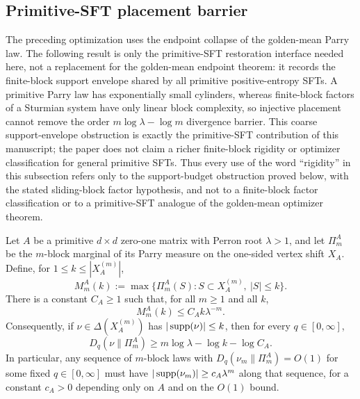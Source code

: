 \subsection{Primitive-SFT placement barrier}

The preceding optimization uses the endpoint collapse of the golden-mean
Parry law.  The following result is only the primitive-SFT restoration
interface needed here, not a replacement for the golden-mean endpoint theorem:
it records the finite-block support envelope shared by all primitive
positive-entropy SFTs.  A primitive Parry law has exponentially small
cylinders, whereas finite-block factors of a Sturmian system have only linear
block complexity, so injective placement cannot remove the order
\(m\log\lambda-\log m\) divergence barrier.  This coarse support-envelope
obstruction is exactly the primitive-SFT contribution of this manuscript; the
paper does not claim a richer finite-block rigidity or optimizer
classification for general primitive SFTs.  Thus every use of the word
``rigidity'' in this subsection refers only to the support-budget obstruction
proved below, with the stated sliding-block factor hypothesis, and not to a
finite-block factor classification or to a primitive-SFT analogue of the
golden-mean optimizer theorem.

\begin{proposition}
\label{prop:primitive-sft-support-envelope}
Let \(A\) be a primitive \(d\times d\) zero-one matrix with Perron root
\(\lambda>1\), and let \(\Pi_m^A\) be the \(m\)-block marginal of its Parry
measure on the one-sided vertex shift \(X_A\).  Define, for
\(1\le k\le |X_A^{(m)}|\),
\[
M_m^A(k):=\max\{\Pi_m^A(S): S\subset X_A^{(m)},\ |S|\le k\}.
\]
There is a constant \(C_A\ge1\) such that, for all \(m\ge1\) and all \(k\),
\[
M_m^A(k)\le C_A k\lambda^{-m}.
\]
Consequently, if \(\nu\in\Delta(X_A^{(m)})\) has \(|\operatorname{supp}(\nu)|\le k\), then
for every \(q\in[0,\infty]\),
\[
D_q(\nu\|\Pi_m^A)\ge m\log\lambda-\log k-\log C_A.
\]
In particular, any sequence of \(m\)-block laws with
\(D_q(\nu_m\|\Pi_m^A)=O(1)\) for some fixed \(q\in[0,\infty]\) must have
\(|\operatorname{supp}(\nu_m)|\ge c_A\lambda^m\) along that sequence, for a constant
\(c_A>0\) depending only on \(A\) and on the \(O(1)\) bound.
\end{proposition}

